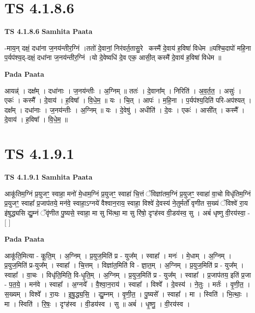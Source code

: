 \documentclass[17pt]{extarticle}
\begin{document}

\section{ TS 4.1.8.6 }

\textbf{TS 4.1.8.6 } \newline
\textbf{Samhita Paata} \newline

-माय॒न् दक्षं॒ दधा॑ना ज॒नय॑न्तीर॒ग्निं ।ततो॑ दे॒वानां॒ निर॑वर्त॒तासु॒रेकः᳡कस्मै॑ दे॒वाय॑ ह॒विषा॑ विधेम ॥यश्चि॒दापो॑ महि॒ना प॒र्यप॑श्य॒द्-दक्षं॒ दधा॑ना ज॒नय॑न्तीर॒ग्निं ।यो दे॒वेष्वधि॑ दे॒व एक॒ आसी॒त् कस्मै॑ दे॒वाय॑ ह॒विषा॑ विधेम ॥ \newline

\textbf{Pada Paata} \newline

आयन्न्॑ । दक्ष᳚म् । दधा॑नाः । ज॒नय॑न्तीः । अ॒ग्निम् ॥ ततः॑ । दे॒वाना᳚म् । निरिति॑ । अ॒व॒र्त॒त॒ । असुः॑ । एकः॑ । कस्मै᳚ । दे॒वाय॑ । ह॒विषा᳚ । वि॒धे॒म॒ ॥ यः । चि॒त् । आपः॑ । म॒हि॒ना । प॒र्यप॑श्य॒दिति॑ परि-अप॑श्यत् । दक्ष᳚म् । दधा॑नाः । ज॒नय॑न्तीः । अ॒ग्निम् ॥ यः । दे॒वेषु॑ । अधीति॑ । दे॒वः । एकः॑ । आसी᳚त् । कस्मै᳚ । दे॒वाय॑ । ह॒विषा᳚ । वि॒धे॒म॒ ॥  \newline





\section{ TS 4.1.9.1 }

\textbf{TS 4.1.9.1 } \newline
\textbf{Samhita Paata} \newline

आकू॑तिम॒ग्निं प्र॒युजꣳ॒॒ स्वाहा॒ मनो॑ मे॒धाम॒ग्निं प्र॒युजꣳ॒॒ स्वाहा॑ चि॒त्तं ॅविज्ञा॑तम॒ग्निं प्र॒युजꣳ॒॒ स्वाहा॑ वा॒चो विधृ॑तिम॒ग्निं प्र॒युजꣳ॒॒ स्वाहा᳚ प्र॒जाप॑तये॒ मन॑वे॒ स्वाहा॒ऽग्नये॑ वैश्वान॒राय॒ स्वाहा॒ विश्वे॑ दे॒वस्य॑ ने॒तुर्मर्तो॑ वृणीत स॒ख्यं ॅविश्वे॑ रा॒य इ॑षुद्ध्यसि द्यु॒म्नं ॅवृ॑णीत पु॒ष्यसे॒ स्वाहा॒ मा सु भि॑त्था॒ मा सु रि॑षो॒ दृꣳह॑स्व वी॒डय॑स्व॒ सु । अबं॑ धृष्णु वी॒रय॑स्वा॒ - [  ] \newline

\textbf{Pada Paata} \newline

आकू॑ति॒मित्या - कू॒ति॒म् । अ॒ग्निम् । प्र॒युज॒मिति॑ प्र - युज᳚म् । स्वाहा᳚ । मनः॑ । मे॒धाम् । अ॒ग्निम् । प्र॒युज॒मिति॑ प्र-युज᳚म् । स्वाहा᳚ । चि॒त्तम् । विज्ञा॑त॒मिति॑ वि - ज्ञा॒त॒म् । अ॒ग्निम् । प्र॒युज॒मिति॑ प्र - युज᳚म् । स्वाहा᳚ । वा॒चः । विधृ॑ति॒मिति॒ वि-धृ॒ति॒म् । अ॒ग्निम् । प्र॒युज॒मिति॑ प्र - युज᳚म् । स्वाहा᳚ । प्र॒जाप॑तय॒ इति॑ प्र॒जा - प॒त॒ये॒ । मन॑वे । स्वाहा᳚ । अ॒ग्नये᳚ । वै॒श्वा॒न॒राय॑ । स्वाहा᳚ । विश्वे᳚ । दे॒वस्य॑ । ने॒तुः । मर्तः॑ । वृ॒णी॒त॒ । स॒ख्यम् । विश्वे᳚ । रा॒यः । इ॒षु॒द्ध्य॒सि॒ । द्यु॒म्नम् । वृ॒णी॒त॒ । पु॒ष्यसे᳚ । स्वाहा᳚ । मा । स्विति॑ । भि॒त्थाः॒ । मा । स्विति॑ । रि॒षः॒ । दृꣳह॑स्व । वी॒डय॑स्व । सु ॥ अबं॑ । धृ॒ष्णु॒ । वी॒रय॑स्व ।  \newline
\end{document}
